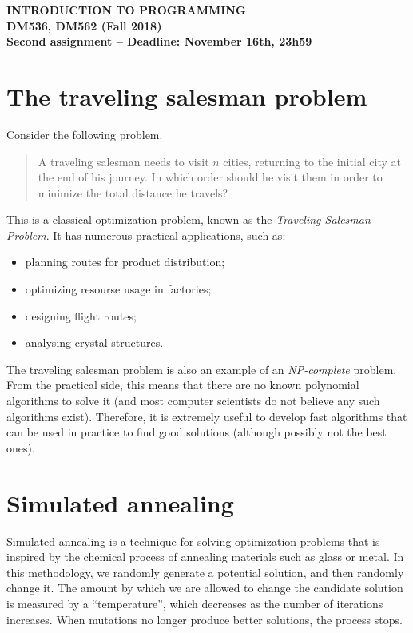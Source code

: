 \documentclass[a4paper]{article}
\begin{document}
\begin{center}\LARGE\bf
  INTRODUCTION TO PROGRAMMING\\
  \Large DM536, DM562 (Fall 2018)\\ \medskip
  \large Second assignment -- Deadline: November 16th, 23h59\\
\end{center}

\section*{The traveling salesman problem}

Consider the following problem.
\begin{quote}
  A traveling salesman needs to visit $n$ cities, returning to the initial city at the end of his
  journey. In which order should he visit them in order to minimize the total distance he travels?
\end{quote}

This is a classical optimization problem, known as the \emph{Traveling Salesman Problem}. It has
numerous practical applications, such as:
\begin{itemize}
\item planning routes for product distribution;
\item optimizing resourse usage in factories;
\item designing flight routes;
\item analysing crystal structures.
\end{itemize}
The traveling salesman problem is also an example of an \emph{NP-complete} problem. From the
practical side, this means that there are no known polynomial algorithms to solve it (and most
computer scientists do not believe any such algorithms exist). Therefore, it is extremely useful to
develop fast algorithms that can be used in practice to find good solutions (although possibly not
the best ones).

\section*{Simulated annealing}

Simulated annealing is a technique for solving optimization problems that is inspired by the
chemical process of annealing materials such as glass or metal. In this methodology, we randomly
generate a potential solution, and then randomly change it. The amount by which we are allowed to
change the candidate solution is measured by a ``temperature'', which decreases as the number of
iterations increases. When mutations no longer produce better solutions, the process stops.
\end{document}
